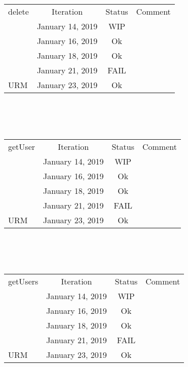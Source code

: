 \documentclass{scrreprt}
\begin{document}
	\\ \\ \\
	\begin{tabularx}{12cm}{X|c|c|c}
		delete & Iteration & Status & Comment  \\
		& January 14, 2019 & WIP & \\
		& January 16, 2019 & Ok & \\
		& January 18, 2019 & Ok & \\
		& January 21, 2019 & FAIL & \\ URM
		& January 23, 2019 & Ok & \\
	\end{tabularx}	
	\\ \\ \\
	\begin{tabularx}{12cm}{X|c|c|c}
		getUser & Iteration & Status & Comment  \\
		& January 14, 2019 & WIP & \\
		& January 16, 2019 & Ok & \\
		& January 18, 2019 & Ok & \\
		& January 21, 2019 & FAIL & \\ URM
		& January 23, 2019 & Ok & \\
	\end{tabularx}	
	\\ \\ \\
	\begin{tabularx}{12cm}{X|c|c|c}
		getUsers & Iteration & Status & Comment  \\
		& January 14, 2019 & WIP & \\
		& January 16, 2019 & Ok & \\
		& January 18, 2019 & Ok & \\
		& January 21, 2019 & FAIL & \\ URM
		& January 23, 2019 & Ok & \\
	\end{tabularx}	

\end{document}
